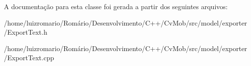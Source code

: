A documentação para esta classe foi gerada a partir dos seguintes arquivos:\begin{DoxyCompactItemize}
\item 
/home/luizromario/Romário/Desenvolvimento/C++/CvMob/src/model/exporter/ExportText.h\item 
/home/luizromario/Romário/Desenvolvimento/C++/CvMob/src/model/exporter/ExportText.cpp\end{DoxyCompactItemize}
